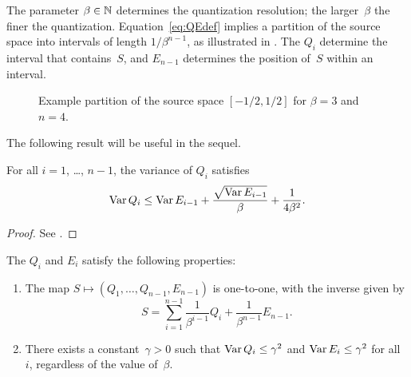 The parameter $\beta \in {\mathbb{N}}$ determines the quantization
resolution; the larger~$\beta$ the finer the quantization.
Equation~\ref{eq:QEdef} implies a partition of the source space into intervals
of length $1/\beta^{n-1}$, as illustrated in . The
$Q_i$ determine the interval that contains~$S$, and $E_{n-1}$ determines the
position of~$S$ within an interval. 

\begin{figure}
  \begin{center}
    
  \end{center}
  \caption{Example partition of the source space $[-1/2,1/2]$ for $\beta = 3$
  and $n = 4$. }
  \label{fig:sourcepartition}
\end{figure}


The following result will be useful in the sequel.

\begin{lemma}
  \label{lem:Qvarbound}
  For all $i = 1$, \dots, $n-1$, the variance of $Q_i$ satisfies
  \begin{equation*}
    \operatorname{Var} Q_i \le \operatorname{Var} E_{i-1} + \frac{\sqrt{\operatorname{Var} E_{i-1}}}{\beta} +
    \frac{1}{4\beta^2}.
  \end{equation*}
\end{lemma}

\begin{proof}
  See .
\end{proof}

\begin{proposition}
  \label{prop:qeproperties}
  The $Q_i$ and $E_i$ satisfy the following properties:
\begin{enumerate}
  \item The map $S \mapsto (Q_1, \dots, Q_{n-1}, E_{n-1})$ is one-to-one, with
    the inverse given by
    \begin{equation}
      \label{eq:unwraprec}
      S = \sum_{i=1}^{n-1} \frac{1}{\beta^{i-1}} Q_i + \frac{1}{\beta^{n-1}}
      E_{n-1}.
    \end{equation}

  \item There exists a constant~$\gamma > 0$ such that $\operatorname{Var} Q_i \le \gamma^2$
    and $\operatorname{Var} E_i \le \gamma^2$ for all~$i$, regardless of the value of~$\beta$.
\end{enumerate}
\end{proposition}

